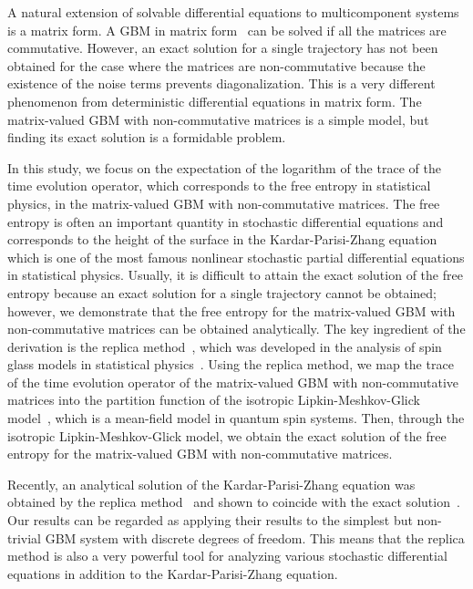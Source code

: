 \documentclass[
aps,
pre,
showpacs
]{revtex4-1}
\begin{document}
A natural extension of solvable differential equations to multicomponent systems is a matrix form.
A GBM in matrix form~\cite{Hu} can be solved if all the matrices are commutative.
However, an exact solution for a single trajectory has not been obtained for the case where the matrices are non-commutative because the existence of the noise terms prevents diagonalization. This is a very different phenomenon from deterministic differential equations in matrix form.
The matrix-valued GBM with non-commutative matrices is a simple model, but finding its exact solution is a formidable problem.
 
In this study, we focus on the expectation of the logarithm of the trace of the time evolution operator, which corresponds to the free entropy in statistical physics, in the matrix-valued GBM with non-commutative matrices.
The free entropy is often an important quantity in stochastic differential equations and corresponds to the height of the surface in the Kardar-Parisi-Zhang equation~\cite{CDR,Dotsenko2,KPZ,BS} which is one of the most famous nonlinear stochastic partial differential equations in statistical physics.
Usually, it is difficult to attain the exact solution of the free entropy because an exact solution for a single trajectory cannot be obtained; however, we demonstrate that the free entropy for the matrix-valued GBM with non-commutative matrices can be obtained analytically.
The key ingredient of the derivation is the replica method~\cite{EA}, which was developed in the analysis of spin glass models in statistical physics~\cite{MGV,Nishimori,Dotsenko}.
Using the replica method, we map the trace of the time evolution operator of the matrix-valued GBM with non-commutative matrices into the partition function of the isotropic Lipkin-Meshkov-Glick model~\cite{LMG}, which is a mean-field model in quantum spin systems.
Then, through the isotropic Lipkin-Meshkov-Glick model, we obtain the exact solution of the free entropy for the matrix-valued GBM with non-commutative matrices.

Recently, an analytical solution of the Kardar-Parisi-Zhang equation was obtained by the replica method~\cite{CDR,Dotsenko2} and shown to coincide with the exact solution~\cite{SS,ACQ}. 
Our results can be regarded as applying their results to the simplest but non-trivial GBM system with discrete degrees of freedom.
This means that the replica method is also a very powerful tool for analyzing various stochastic differential equations in addition to the Kardar-Parisi-Zhang equation.
\end{document}
